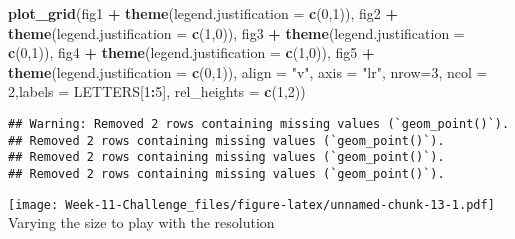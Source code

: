 \documentclass[
]{article}
\newenvironment{Shaded}{\begin{snugshade}}{\end{snugshade}}
\newcommand{\AttributeTok}[1]{\textcolor[rgb]{0.13,0.29,0.53}{#1}}
\newcommand{\DecValTok}[1]{\textcolor[rgb]{0.00,0.00,0.81}{#1}}
\newcommand{\FunctionTok}[1]{\textcolor[rgb]{0.13,0.29,0.53}{\textbf{#1}}}
\newcommand{\NormalTok}[1]{#1}
\newcommand{\SpecialCharTok}[1]{\textcolor[rgb]{0.81,0.36,0.00}{\textbf{#1}}}
\newcommand{\StringTok}[1]{\textcolor[rgb]{0.31,0.60,0.02}{#1}}
\begin{document}
\begin{Shaded}
\begin{Highlighting}[]
\FunctionTok{plot\_grid}\NormalTok{(fig1 }\SpecialCharTok{+} \FunctionTok{theme}\NormalTok{(}\AttributeTok{legend.justification =} \FunctionTok{c}\NormalTok{(}\DecValTok{0}\NormalTok{,}\DecValTok{1}\NormalTok{)),}
\NormalTok{          fig2 }\SpecialCharTok{+} \FunctionTok{theme}\NormalTok{(}\AttributeTok{legend.justification =} \FunctionTok{c}\NormalTok{(}\DecValTok{1}\NormalTok{,}\DecValTok{0}\NormalTok{)),}
\NormalTok{          fig3 }\SpecialCharTok{+} \FunctionTok{theme}\NormalTok{(}\AttributeTok{legend.justification =} \FunctionTok{c}\NormalTok{(}\DecValTok{0}\NormalTok{,}\DecValTok{1}\NormalTok{)),}
\NormalTok{          fig4 }\SpecialCharTok{+} \FunctionTok{theme}\NormalTok{(}\AttributeTok{legend.justification =} \FunctionTok{c}\NormalTok{(}\DecValTok{1}\NormalTok{,}\DecValTok{0}\NormalTok{)),}
\NormalTok{          fig5 }\SpecialCharTok{+} \FunctionTok{theme}\NormalTok{(}\AttributeTok{legend.justification =} \FunctionTok{c}\NormalTok{(}\DecValTok{0}\NormalTok{,}\DecValTok{1}\NormalTok{)),}
          \AttributeTok{align =} \StringTok{"v"}\NormalTok{, }\AttributeTok{axis =} \StringTok{"lr"}\NormalTok{, }\AttributeTok{nrow=}\DecValTok{3}\NormalTok{, }\AttributeTok{ncol =} \DecValTok{2}\NormalTok{,}\AttributeTok{labels =}\NormalTok{ LETTERS[}\DecValTok{1}\SpecialCharTok{:}\DecValTok{5}\NormalTok{], }\AttributeTok{rel\_heights =} \FunctionTok{c}\NormalTok{(}\DecValTok{1}\NormalTok{,}\DecValTok{2}\NormalTok{))}
\end{Highlighting}
\end{Shaded}

\begin{verbatim}
## Warning: Removed 2 rows containing missing values (`geom_point()`).
## Removed 2 rows containing missing values (`geom_point()`).
## Removed 2 rows containing missing values (`geom_point()`).
## Removed 2 rows containing missing values (`geom_point()`).
\end{verbatim}

\texttt{[image: Week-11-Challenge\_files/figure-latex/unnamed-chunk-13-1.pdf]}
Varying the size to play with the resolution
\end{document}
